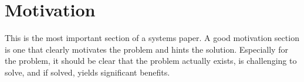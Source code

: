 \section{Motivation}\label{sec:motivation}

This is the most important section of a systems paper.
A good motivation section is one that clearly motivates the problem and hints the solution.
Especially for the problem, it should be clear that the problem actually exists, is challenging to solve, and if solved, yields significant benefits.
